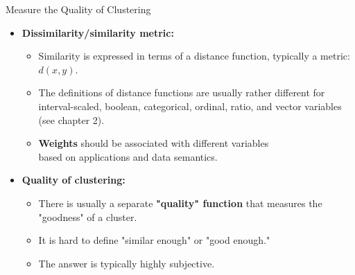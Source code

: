 \begin{frame}{Measure the Quality of Clustering}
	\begin{itemize}
		\item \textbf{Dissimilarity/similarity metric:}
		      \begin{itemize}
			      \item Similarity is expressed in terms of a distance function,
			            typically a metric: $d(x,y)$.
			      \item The definitions of distance functions are usually rather
			            different for interval-scaled, boolean, categorical, ordinal,
			            ratio, and vector variables (see chapter 2).
			      \item \textbf{\color{airforceblue}Weights} should be associated
			            with different variables \\
			            based on applications and data semantics.
		      \end{itemize}
		\item \textbf{Quality of clustering:}
		      \begin{itemize}
			      \item There is usually a separate
			            \textbf{\color{airforceblue}"quality" function} that measures the
			            "goodness" of a cluster.
			      \item It is hard to define "similar enough" or "good enough."
			      \item The answer is typically highly subjective.
		      \end{itemize}
	\end{itemize}
\end{frame}

